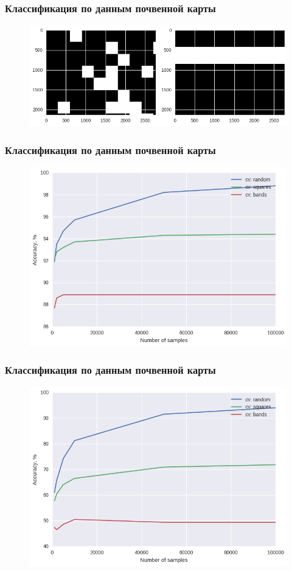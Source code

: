 \documentclass{beamer}
\begin{document}
\begin{frame}
\frametitle{Классификация по данным почвенной карты}
\begin{figure}[H]
\centering
\includegraphics[width=0.8\linewidth]{imgs/validation_masks.png}
\end{figure}
\end{frame}

\begin{frame}
\frametitle{Классификация по данным почвенной карты}
\begin{figure}[H]
\centering
\includegraphics[width=0.8\linewidth]{imgs/map_validations_3_classes.png}
\end{figure}
\end{frame}

\begin{frame}
\frametitle{Классификация по данным почвенной карты}
\begin{figure}[H]
\centering
\includegraphics[width=0.8\linewidth]{imgs/map_validations_9_classes.png}
\end{figure}
\end{frame}
\end{document}
